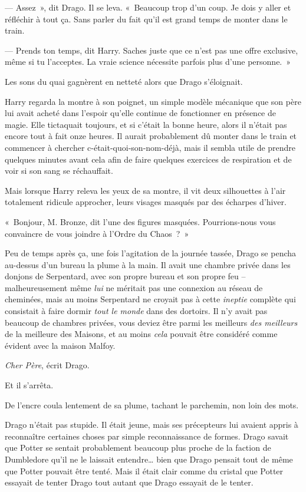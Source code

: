 --- Assez~», dit Drago. Il se leva. «~Beaucoup trop d'un coup. Je dois y aller et réfléchir à tout ça. Sans parler du fait qu'il est grand temps de monter dans le train.

--- Prends ton temps, dit Harry. Saches juste que ce n'est pas une offre exclusive, même si tu l'acceptes. La vraie science nécessite parfois plus d'une personne.~»

Les sons du quai gagnèrent en netteté alors que Drago s'éloignait.

Harry regarda la montre à son poignet, un simple modèle mécanique que son père lui avait acheté dans l'espoir qu'elle continue de fonctionner en présence de magie. Elle tictaquait toujours, et si c'était la bonne heure, alors il n'était pas encore tout à fait onze heures. Il aurait probablement dû monter dans le train et commencer à chercher c-était-quoi-son-nom-déjà, mais il sembla utile de prendre quelques minutes avant cela afin de faire quelques exercices de respiration et de voir si son sang se réchauffait.

Mais lorsque Harry releva les yeux de sa montre, il vit deux silhouettes à l'air totalement ridicule approcher, leurs visages masqués par des écharpes d'hiver.

«~Bonjour, M. Bronze, dit l'une des figures masquées. Pourrions-nous vous convaincre de vous joindre à l'Ordre du Chaos~?~»


Peu de temps après ça, une fois l'agitation de la journée tassée, Drago se pencha au-dessus d'un bureau la plume à la main. Il avait une chambre privée dans les donjons de Serpentard, avec son propre bureau et son propre feu -- malheureusement même \emph{lui} ne méritait pas une connexion au réseau de cheminées, mais au moins Serpentard ne croyait pas à cette \emph{ineptie} complète qui consistait à faire dormir \emph{tout le monde} dans des dortoirs. Il n'y avait pas beaucoup de chambres privées, vous deviez être parmi les meilleurs \emph{des meilleurs} de la meilleure des Maisons, et au moins \emph{cela} pouvait être considéré comme évident avec la maison Malfoy.

\emph{Cher Père}, écrit Drago.

Et il s'arrêta.

De l'encre coula lentement de sa plume, tachant le parchemin, non loin des mots.

Drago n'était pas stupide. Il était jeune, mais ses précepteurs lui avaient appris à reconnaître certaines choses par simple reconnaissance de formes. Drago savait que Potter se sentait probablement beaucoup plus proche de la faction de Dumbledore qu'il ne le laissait entendre… bien que Drago pensait tout de même que Potter pouvait être tenté. Mais il était clair comme du cristal que Potter essayait de tenter Drago tout autant que Drago essayait de le tenter.


